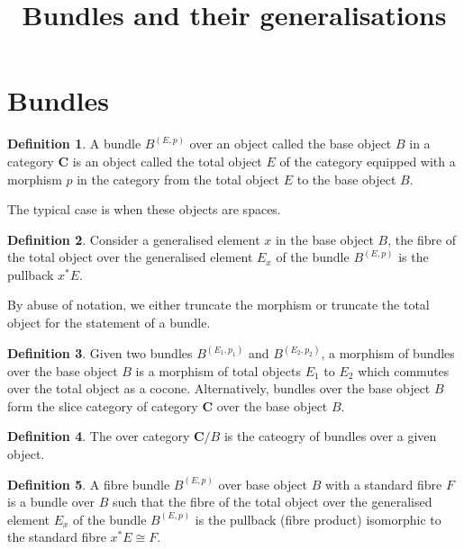 \documentclass[10pt]{article}
\theoremstyle{plain}%
\theoremstyle{definition}
\newtheorem{definition}{Definition}[section]
\theoremstyle{remark}
\begin{document}
\title{Bundles and their generalisations}

\maketitle

\section{Bundles}

\begin{definition}
	A bundle $B^{(E,p)}$ over an object called the base object $B$ in a category $\mathbf{C}$ is an object called the total object $E$ of the category equipped with a morphism $p$ in the category from the total object $E$ to the base object $B$.
\end{definition}

The typical case is when these objects are spaces.

\begin{definition}
	Consider a generalised element $x$ in the base object $B$, the fibre of the total object over the generalised element $E_x$ of the bundle $B^{(E, p)}$ is the pullback $x^*E$.
\end{definition}

By abuse of notation, we either truncate the morphism or truncate the total object for the statement of a bundle.

\begin{definition}
	Given two bundles $B^{(E_1, p_1)}$ and $B^{(E_2, p_2)}$, a morphism of bundles over the base object $B$ is a morphism of total objects $E_1$ to $E_2$ which commutes over the total object as a cocone. Alternatively, bundles over the base object $B$ form the slice category of category $\mathbf{C}$ over the base object $B$. 
\end{definition}

\begin{definition}
	The over category $\mathbf{C} / B$ is the cateogry of bundles over a given object.
\end{definition}

\begin{definition}
	A fibre bundle $B^{(E, p)}$ over base object $B$ with a standard fibre $F$ is a bundle over $B$ such that the fibre of the total object over the generalised element $E_x$ of the bundle $B^{(E, p)}$ is the pullback (fibre product) isomorphic to the standard fibre $x^*E \cong F$.
\end{definition}
\end{document}
